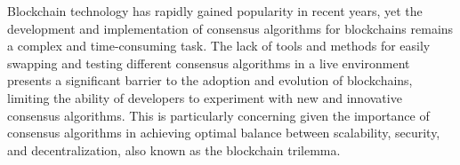 % 
% 
% 
% 
% 

Blockchain technology has rapidly gained popularity in recent years, yet the development and implementation of consensus algorithms for blockchains remains a complex and time-consuming task. The lack of tools and methods for easily swapping and testing different consensus algorithms in a live environment presents a significant barrier to the adoption and evolution of blockchains, limiting the ability of developers to experiment with new and innovative consensus algorithms. This is particularly concerning given the importance of consensus algorithms in achieving optimal balance between scalability, security, and decentralization, also known as the blockchain trilemma.

